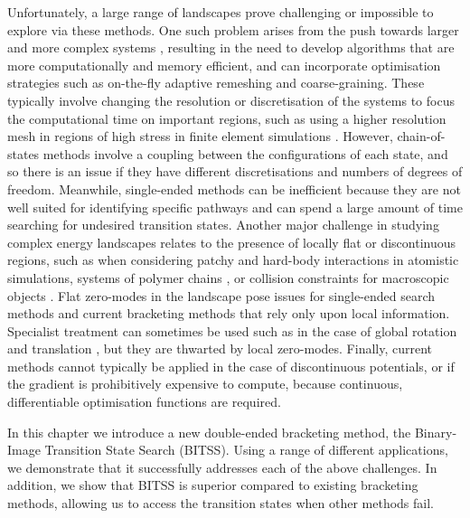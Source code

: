 Unfortunately, a large range of landscapes prove challenging or impossible to explore via these methods.
One such problem arises from the push towards larger and more complex systems \cite{Trefethen2013,Shalf2020,Alexander2020}, resulting in the need to develop algorithms that are more computationally and memory efficient, and can incorporate optimisation strategies such as on-the-fly adaptive remeshing and coarse-graining.
These typically involve changing the resolution or discretisation of the systems to focus the computational time on important regions, such as using a higher resolution mesh in regions of high stress in finite element simulations \cite{Lee1994}.
However, chain-of-states methods involve a coupling between the configurations of each state, and so there is an issue if they have different discretisations and numbers of degrees of freedom.
Meanwhile, single-ended methods can be inefficient because they are not well suited for identifying specific pathways and can spend a large amount of time searching for undesired transition states.
Another major challenge in studying complex energy landscapes relates to the presence of locally flat or discontinuous regions, such as when considering patchy \cite{McMullen2018,Nguemaha2018,Chen2018b} and hard-body \cite{Richard2018,Santra2018} interactions in atomistic simulations, systems of polymer chains \cite{Mokkonen2016}, or collision constraints for macroscopic objects \cite{Wriggers2006}.
Flat zero-modes in the landscape pose issues for single-ended search methods and current bracketing methods that rely only upon local information.
Specialist treatment can sometimes be used such as in the case of global rotation and translation \cite{Page1988}, but they are thwarted by local zero-modes.
Finally, current methods cannot typically be applied in the case of discontinuous potentials, or if the gradient is prohibitively expensive to compute, because continuous, differentiable optimisation functions are required.

In this chapter we introduce a new double-ended bracketing method, the Binary-Image Transition State Search (BITSS).
Using a range of different applications, we demonstrate that it successfully addresses each of the above challenges.
In addition, we show that BITSS is superior compared to existing bracketing methods, allowing us to access the transition states when other methods fail.


